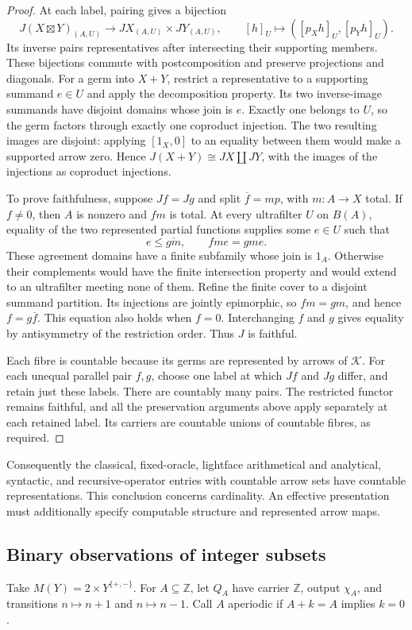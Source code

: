 \documentclass[11pt]{article}
\theoremstyle{definition}
\newcommand{\Z}{\mathbb Z}
\begin{document}
\begin{proof}
At each label, pairing gives a bijection
\[
 J(X\boxtimes Y)_{(A,U)}
 \longrightarrow JX_{(A,U)}\times JY_{(A,U)},
 \qquad [h]_U\longmapsto([p_Xh]_U,[p_Yh]_U).
\]
Its inverse pairs representatives after intersecting their supporting
members. These bijections commute with postcomposition and preserve
projections and diagonals. For a germ into $X+Y$, restrict a
representative to a supporting summand $e\in U$ and apply the
decomposition property. Its two inverse-image summands have disjoint
domains whose join is $e$. Exactly one belongs to $U$, so the germ
factors through exactly one coproduct injection. The two resulting
images are disjoint: applying $[1_X,0]$ to an equality between them
would make a supported arrow zero. Hence
$J(X+Y)\cong JX\amalg JY$, with the images of the injections as
coproduct injections.

To prove faithfulness, suppose $Jf=Jg$ and split
$\overline f=mp$, with $m:A\to X$ total. If $f\ne0$, then $A$
is nonzero and $fm$ is total. At every ultrafilter $U$ on $B(A)$,
equality of the two represented partial functions supplies some
$e\in U$ such that
\[
 e\leq\overline{gm},\qquad fme=gme.
\]
These agreement domains have a finite subfamily whose join is $1_A$.
Otherwise their complements would have the finite intersection
property and would extend to an ultrafilter meeting none of them.
Refine the finite cover to a disjoint summand partition. Its
injections are jointly epimorphic, so $fm=gm$, and hence
$f=g\overline f$. This equation also holds when $f=0$.
Interchanging $f$ and $g$ gives equality by antisymmetry of the
restriction order. Thus $J$ is faithful.

Each fibre is countable because its germs are represented by arrows
of $\mathcal K$. For each unequal parallel pair $f,g$, choose one
label at which $Jf$ and $Jg$ differ, and retain just these labels.
There are countably many pairs. The restricted functor remains
faithful, and all the preservation arguments above apply separately
at each retained label. Its carriers are countable unions of
countable fibres, as required.
\end{proof}

Consequently the classical, fixed-oracle, lightface arithmetical and
analytical, syntactic, and recursive-operator entries with countable
arrow sets have countable representations. This conclusion concerns
cardinality. An effective presentation must additionally specify
computable structure and represented arrow maps.

\subsection{Binary observations of integer subsets}
Take $M(Y)=2\times Y^{\{+,-\}}$. For $A\subseteq\Z$, let $Q_A$
have carrier $\Z$, output $\chi_A$, and transitions $n\mapsto n+1$
and $n\mapsto n-1$. Call $A$ aperiodic if $A+k=A$ implies $k=0$.
\end{document}

